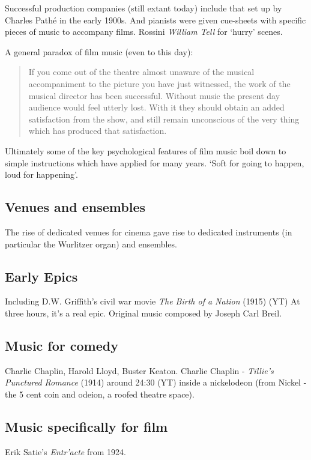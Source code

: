 Successful production companies (still extant today) include that set up by Charles Path\'e in the early 1900s. And pianists were given cue-sheets with specific pieces of music to accompany films. Rossini \textit{William Tell} for `hurry' scenes. 

A general paradox of film music (even to this day):
\begin{quotation}
If you come out of the theatre almost unaware of the musical accompaniment to the picture you have just witnessed, the work of the musical director has been successful. Without music the present day audience would feel utterly lost. With it they should obtain an added satisfaction from the show, and still remain unconscious of the very thing which has produced that satisfaction. 

\end{quotation}

Ultimately some of the key psychological features of film music boil down to simple instructions which have applied for many years. `Soft for going to happen, loud for happening'. 

\subsection{Venues and ensembles}
The rise of dedicated venues for cinema gave rise to dedicated instruments (in particular the Wurlitzer organ) and ensembles. 

\subsection{Early Epics}
Including D.W. Griffith's civil war movie \textit{The Birth of a Nation} (1915) (YT)
At three hours, it's a real epic. Original music composed by Joseph Carl Breil.

\subsection{Music for comedy}
Charlie Chaplin, Harold Lloyd, Buster Keaton.
Charlie Chaplin - \textit{Tillie's Punctured Romance} (1914) around 24:30 (YT) inside a nickelodeon (from Nickel - the 5 cent coin and odeion, a roofed theatre space).

\subsection{Music specifically for film}
Erik Satie's \textit{Entr'acte} from 1924.

